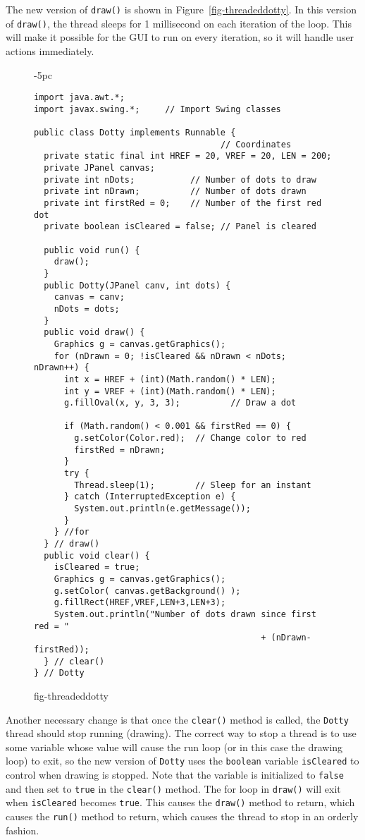 The new version of {\tt draw()} is shown in
Figure~\ref{fig-threadeddotty}.  In this version of {\tt draw()}, the
thread sleeps for 1 millisecond on each iteration of the loop.  This
will make it possible for the GUI to run on every iteration, so it
will handle user actions immediately.

\begin{figure}[p]
\jjjprogstart
\begin{jjjlistingleft}[31pc]{-5pc}
\begin{lstlisting}
import java.awt.*;
import javax.swing.*;     // Import Swing classes

public class Dotty implements Runnable {
                                     // Coordinates
  private static final int HREF = 20, VREF = 20, LEN = 200; 
  private JPanel canvas;
  private int nDots;           // Number of dots to draw
  private int nDrawn;          // Number of dots drawn
  private int firstRed = 0;    // Number of the first red dot
  private boolean isCleared = false; // Panel is cleared

  public void run() {
    draw();
  }
  public Dotty(JPanel canv, int dots) {
    canvas = canv;
    nDots = dots;
  }
  public void draw() {
    Graphics g = canvas.getGraphics();
    for (nDrawn = 0; !isCleared && nDrawn < nDots; nDrawn++) {
      int x = HREF + (int)(Math.random() * LEN);
      int y = VREF + (int)(Math.random() * LEN);
      g.fillOval(x, y, 3, 3);          // Draw a dot

      if (Math.random() < 0.001 && firstRed == 0) {
        g.setColor(Color.red);  // Change color to red
        firstRed = nDrawn;
      }
      try {
        Thread.sleep(1);        // Sleep for an instant
      } catch (InterruptedException e) {
        System.out.println(e.getMessage());
      }
    } //for
  } // draw()
  public void clear() {
    isCleared = true;
    Graphics g = canvas.getGraphics();
    g.setColor( canvas.getBackground() );
    g.fillRect(HREF,VREF,LEN+3,LEN+3);
    System.out.println("Number of dots drawn since first red = "
                                             + (nDrawn-firstRed));
  } // clear()
} // Dotty
\end{lstlisting}
\end{jjjlistingleft}
{fig-threadeddotty}
\end{figure}

Another necessary change is that once the {\tt clear()} method is
called, the {\tt Dotty} thread should stop running (drawing). The
correct way to stop a thread is to use some variable whose value will
cause the run loop (or in this case the drawing loop) to exit, so the
new version of {\tt Dotty} uses the {\tt boolean} variable
{\tt isCleared} to control when drawing is stopped.  Note that the variable
is initialized to {\tt false} and then set to {\tt true} in the
{\tt clear()} method.  The for loop in {\tt draw()} will exit when
{\tt isCleared} becomes {\tt true}. This causes the {\tt draw()} method
to return, which causes the {\tt run()} method to return, which
causes the thread to stop in an orderly fashion.

